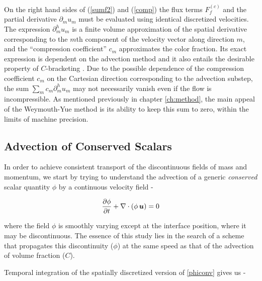On the right hand sides of (\ref{sumf2}) and (\ref{comp}) 
the flux terms $F_{f}^{(c)}$ and the 
 partial derivative $\partial_{m} u_m$ must
be evaluated using identical discretized velocities.
The expression $\partial_{m}^h u_m$ is a finite volume approximation of the 
spatial derivative corresponding to the $m$th component 
of the velocity vector along direction $m$, and
the ``compression coefficient'' $c_m$ approximates the color fraction. 
Its exact expression is dependent on the advection method
and it also entails the desirable property of $C$-bracketing
. 
Due to the possible dependence of the 
compression coefficient $c_m$ on the Cartesian direction
corresponding to the advection substep, 
the sum $\sum_m c_m \partial_{m}^h u_m$ may not necessarily vanish
even if the flow is incompressible.
As mentioned previously in chapter \ref{ch:method}, the main appeal
of the Weymouth-Yue method is its ability to keep this sum to zero,
within the limits of machine precision. 

\subsection*{Advection of Conserved Scalars}  

In order to achieve consistent transport of the discontinuous fields 
of mass and momentum, we start by trying to understand the advection 
of a generic \textit{conserved} scalar quantity $\phi$ by a continuous velocity field - 


\begin{align}
	\frac{\partial \phi}{\partial t} + \nabla \cdot \left( \phi \, \boldsymbol{u} \right)  = 0 
\label{phiconv}
\end{align}


where the field $\phi$ is smoothly varying except 
at the interface position, where it may be discontinuous.
The essence of this study lies in the search of a scheme that  
propagates this discontinuity ($\phi$) at the same speed as 
that of the advection of volume fraction ($C$).


Temporal integration of the spatially discretized version of \eqref{phiconv} gives us - 

